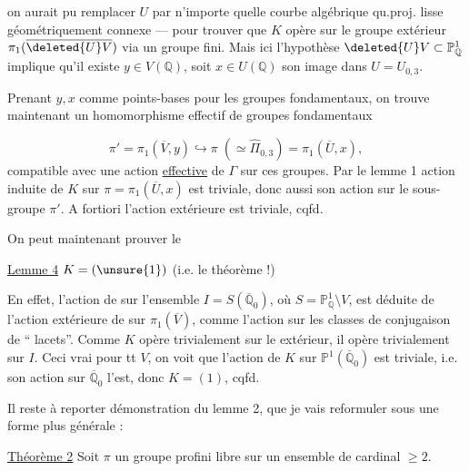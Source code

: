 \unsure{(} on aurait pu remplacer $U$ par n'importe quelle courbe algébrique qu.proj. lisse géométriquement connexe --- pour trouver que $K$ opère sur le groupe extérieur $\pi_1(\overline{\deleted{U}V})$ via un groupe fini. Mais ici l'hypothèse $\deleted{U}V\subset\mathbb P^1_{\mathbb Q}$ implique qu'il existe $y\in V(\mathbb Q)$, soit $x\in U(\mathbb Q)$ son image dans $U=U_{0,3}$.

Prenant  $y,x$ comme points-bases pour les groupes fondamentaux, on trouve maintenant un homomorphisme effectif de groupes fondamentaux


\[
\pi'=\pi_1(\overline V,y)\hookrightarrow
\pi\;(\simeq\widehat{\Pi}_{0,3})=\pi_1(\overline U,x),
\]
compatible avec une action \uline{effective} de $\Gamma$ sur ces groupes. Par le lemme 1
action induite de $K$ sur $\pi=\pi_1(\overline U,x)$ est triviale,
donc aussi son action sur le sous-groupe $\pi'$. A fortiori l'action extérieure est triviale, cqfd.

On peut maintenant prouver le

\uline{Lemme 4} $K=(\unsure{1})$ (i.e. le théorème !)

En effet,  l'action de
\deleted{\unsure{$\Gamma$}} sur l'ensemble
$I=S(\overline{\mathbb Q}_0)$, où $S=\mathbb P^1_{\mathbb Q}\setminus V$,
est déduite de l'action extérieure de
\deleted{\unsure{$\Gamma$}} sur $\pi_1(\overline V)$,
 comme l'action sur les classes de conjugaison de
``\unsure{,} lacets''. Comme $K$ opère trivialement sur le  extérieur,
il opère trivialement sur $I$. Ceci  vrai pour tt $V$, on voit que l'action de $K$
sur $\mathbb P^1(\overline{\mathbb Q}_0)$
est triviale, i.e. son action sur $\overline{\mathbb Q}_0$ l'est,
donc $K=(1)$, cqfd.



Il reste à reporter  démonstration du lemme 2, que je vais reformuler sous une forme plus générale :

\uline{Théorème 2} Soit $\pi$ un groupe profini libre sur un ensemble  de cardinal $\geq 2$.

